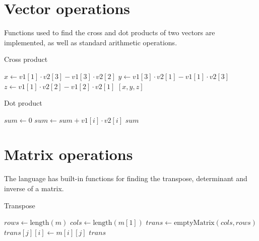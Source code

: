 \section{Vector operations}\label{sec:vector-ops}

Functions used to find the cross and dot products of two vectors are implemented, as well as standard arithmetic
operations.

\begin{algorithm}
    \caption{Cross product}
    \begin{algorithmic}
            \State $x \gets v1[1] \cdot v2[3] - v1[3] \cdot v2[2]$
            \State $y \gets v1[3] \cdot v2[1] - v1[1] \cdot v2[3]$
            \State $z \gets v1[1] \cdot v2[2] - v1[2] \cdot v2[1]$
            \State \Return $[x, y, z]$
        \EndFunction
    \end{algorithmic}\label{alg:algorithm6}
\end{algorithm}

\begin{algorithm}
    \caption{Dot product}
    \begin{algorithmic}
            \State $sum \gets 0$
                \State $sum \gets sum + v1[i] \cdot v2[i]$
            \EndFor
            \State \Return $sum$
        \EndFunction
    \end{algorithmic}\label{alg:algorithm7}
\end{algorithm}

\section{Matrix operations}\label{sec:matrix-ops}

The language has built-in functions for finding the transpose, determinant and inverse of a matrix.

\begin{algorithm}
    \caption{Transpose}
    \begin{algorithmic}
            \State $rows \gets \text{length}(m)$
            \State $cols \gets \text{length}(m[1])$
            \State $trans \gets \text{emptyMatrix}(cols, rows)$
                    \State $trans[j][i] \gets m[i][j]$
                \EndFor
            \EndFor
            \State \Return $trans$
        \EndFunction
    \end{algorithmic}\label{alg:algorithm8}
\end{algorithm}

